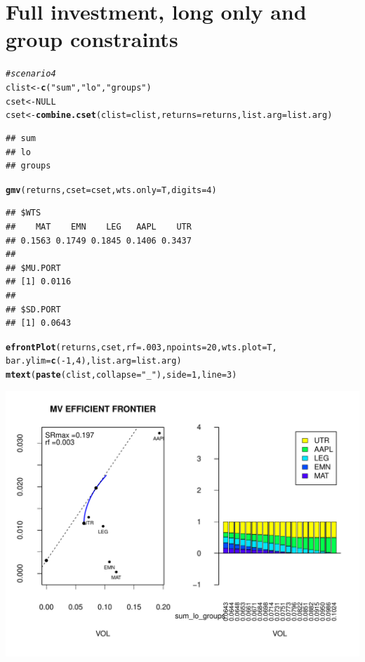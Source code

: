 \documentclass{uwstat518}\usepackage[]{graphicx}\usepackage[]{color}
\makeatletter
\def\maxwidth{ %
  \ifdim\Gin@nat@width>\linewidth
    \linewidth
  \else
    \Gin@nat@width
  \fi
}
\newcommand{\hlstr}[1]{\textcolor[rgb]{0.192,0.494,0.8}{#1}}%
\newcommand{\hlcom}[1]{\textcolor[rgb]{0.678,0.584,0.686}{\textit{#1}}}%
\newcommand{\hlkwd}[1]{\textcolor[rgb]{0.737,0.353,0.396}{\textbf{#1}}}%
\newenvironment{kframe}{%
 \def\at@end@of@kframe{}%
 \ifinner\ifhmode%
  \def\at@end@of@kframe{\end{minipage}}%
  \begin{minipage}{\columnwidth}%
 \fi\fi%
 \def\FrameCommand##1{\hskip\@totalleftmargin \hskip-\fboxsep
 \colorbox{shadecolor}{##1}\hskip-\fboxsep
     \hskip-\linewidth \hskip-\@totalleftmargin \hskip\columnwidth}%
 \MakeFramed {\advance\hsize-\width
   \@totalleftmargin\z@ \linewidth\hsize
   \@setminipage}}%
 {\par\unskip\endMakeFramed%
 \at@end@of@kframe}
\newenvironment{knitrout}{}{} %
\makeatother
\begin{document}
\newpage
\section{Full investment, long only and group constraints}
\begin{knitrout}
\color{fgcolor}\begin{kframe}
\begin{alltt}
\hlcom{# scenario 4}
clist <- \hlkwd{c}(\hlstr{"sum"},\hlstr{"lo"},\hlstr{"groups"})
cset <- NULL
cset <-\hlkwd{combine.cset}(clist=clist,returns=returns,list.arg=list.arg)
\end{alltt}
\begin{verbatim}
## sum 
## lo 
## groups
\end{verbatim}
\begin{alltt}
\hlkwd{gmv}(returns, cset=cset, wts.only=T,digits=4)
\end{alltt}
\begin{verbatim}
## $WTS
##    MAT    EMN    LEG   AAPL    UTR 
## 0.1563 0.1749 0.1845 0.1406 0.3437 
## 
## $MU.PORT
## [1] 0.0116
## 
## $SD.PORT
## [1] 0.0643
\end{verbatim}
\begin{alltt}
\hlkwd{efrontPlot}(returns, cset, rf = .003, npoints = 20,wts.plot = T,
		bar.ylim = \hlkwd{c}(-1,4),list.arg=list.arg)
\hlkwd{mtext}(\hlkwd{paste}(clist,collapse=\hlstr{"_"}),side=1,line=3)
\end{alltt}
\end{kframe}
\includegraphics[width=\maxwidth]{figure/unnamed-chunk-7} 

\end{knitrout}
\end{document}
